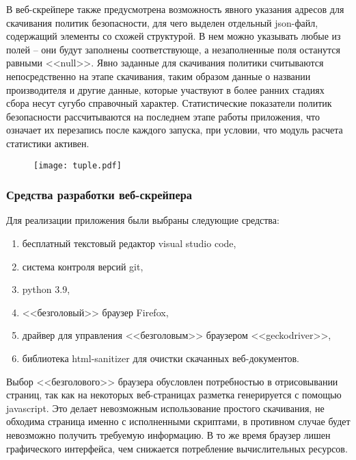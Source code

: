 \documentclass[../main]{subfiles}
\begin{document}
В веб-скрейпере также предусмотрена возможность явного указания адресов для скачивания политик безопасности, для чего выделен отдельный json-файл, содержащий элементы со схожей структурой. В нем можно указывать любые из полей -- они будут заполнены соответствующе, а незаполненные поля останутся равными <<null>>. Явно заданные для скачивания политики считываются непосредственно на этапе скачивания, таким образом данные о названии производителя и другие данные, которые участвуют в более ранних стадиях сбора несут сугубо справочный характер. Статистические показатели политик безопасности рассчитываются на последнем этапе работы приложения, что означает их перезапись после каждого запуска, при условии, что модуль расчета статистики активен.

\begin{figure}[H]
    \centering
    {\texttt{[image: tuple.pdf]}}
    \vspace{-\baselineskip}
\end{figure}

\subsubsection{Средства разработки веб-скрейпера}
Для реализации приложения были выбраны следующие средства:
\begin{enumerate}
    \item бесплатный текстовый редактор visual studio code,
    \item система контроля версий git,
    \item python 3.9,
    \item <<безголовый>> браузер Firefox,
    \item драйвер для управления <<безголовым>> браузером <<geckodriver>>,
    \item библиотека html-sanitizer для очистки скачанных веб-документов. 
\end{enumerate}

Выбор <<безголового>> браузера обусловлен потребностью в отрисовывании страниц, так как на некоторых веб-страницах разметка генерируется с помощью javascript. Это делает невозможным использование простого скачивания, не обходима страница именно с исполненными скриптами, в противном случае будет невозможно получить требуемую информацию. В то же время браузер лишен графического интерфейса, чем снижается потребление вычислительных ресурсов. 
\end{document}
